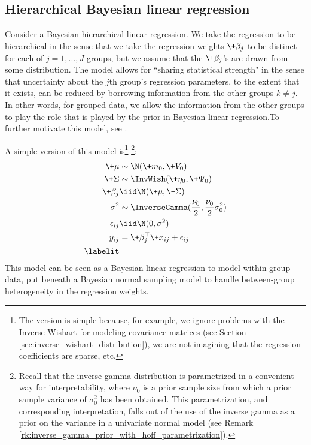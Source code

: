 \documentclass{article} %
\newcommand{\naturalParam}{\+\eta}
\begin{document}
\subsection{Hierarchical Bayesian linear regression} \label{sec:hierarchial_linear_regression}

Consider a Bayesian hierarchical linear regression.    We take the regression to be hierarchical in the sense that we take the regression weights $\+\beta_j$ to be distinct for each of $j=1,...,J$ groups,  but we assume that the $\+\beta_j$'s are drawn from some distribution.     The model allows for ``sharing statistical strength" in the sense that uncertainty about the $j$th group's regression parameters,  to the extent that it exists,  can be reduced by borrowing information from the other groups $k \neq j$.    In other words,  for grouped data,  we allow the information from the other groups to play the role that is played by the prior in Bayesian linear regression.To further motivate this model,  see \cite{hoff2009first}.

A simple version of this model is\footnote{The version is simple because,  for example,   we ignore problems with the Inverse Wishart for modeling covariance matrices (see Section \ref{sec:inverse_wishart_distribution}),  we are not imagining that the regression coefficients are sparse,  etc.} \footnote{Recall that the inverse gamma distribution is parametrized in a convenient way for interpretability,  where $\nu_0$ is a prior sample size from which a  prior sample variance of $\sigma_0^2$ has been obtained.  This parametrization,  and corresponding interpretation,  falls out of the use of the inverse gamma as a prior on the variance in a univariate normal model (see Remark \ref{rk:inverse_gamma_prior_with_hoff_parametrization}). }:
\begin{align*}
\+\mu &\sim  \N (\+m_0,\+V_0) \\
\+\Sigma &\sim \InvWish(\naturalParam_0,  \+\Psi_0) \\
\+\beta_j &\iid \N(\+\mu,  \+\Sigma) \\
\sigma^2 &\sim \InverseGamma (\frac{\nu_0}{2}, \frac{\nu_0}{2} \sigma_0^2) \\
\epsilon_{ij} &\iid \N(0, \sigma^2) \\
y_{ij} &= \+\beta_j^\top \+x_{ij} + \epsilon_{ij} \\
\labelit \label{eqn:hierarchical_linear_regression}
\end{align*}
This model can be seen as a Bayesian linear regression to model within-group data,  put beneath a Bayesian normal sampling model to handle between-group heterogeneity in the regression weights. 
 
\end{document}

